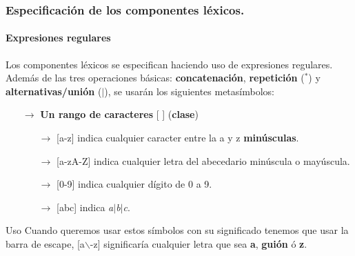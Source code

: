 \documentclass{beamer}
\begin{document}
		\begin{frame}
			\frametitle{Especificaci\'on de los componentes l\'exicos.}
			\framesubtitle{Expresiones regulares}

			\begin{exampleblock}{}
			    Los componentes l\'exicos se especifican haciendo uso de expresiones regulares. Adem\'as de las tres operaciones b\'asicas: \textbf{concatenaci\'on}, \textbf{repetici\'on} ($^*$) y \textbf{alternativas/uni\'on} ($|$), se usar\'an los siguientes metas\'imbolos:
			    \begin{itemize}
			        \item[$\rightarrow$] \textbf{Un rango de caracteres} [ ] (\textbf{clase})
			        \begin{itemize}
			            \item[$\rightarrow$] [a-z] indica cualquier caracter entre la a y z \textbf{min\'usculas}.
			            \item[$\rightarrow$] [a-zA-Z] indica cualquier letra del abecedario min\'uscula o may\'uscula.
			            \item[$\rightarrow$] [0-9] indica cualquier d\'igito de 0 a 9.
			            \item[$\rightarrow$] [abc] indica \emph{a}$|$\emph{b}$|$\emph{c}.
			        \end{itemize}
			    \end{itemize}
			\end{exampleblock}
			\begin{alertblock}{Uso}
			   Cuando queremos usar estos s\'imbolos con su significado tenemos que usar la barra de escape, [a$\backslash$-z] significar\'ia cualquier letra que sea \textbf{a}, \textbf{gui\'on} \'o \textbf{z}.
			\end{alertblock}
		\end{frame}		
\end{document}
